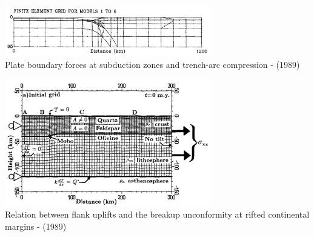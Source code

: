 \begin{center}
\begin{minipage}{0.48\textwidth}
\centering
\includegraphics[width=9cm]{images/history/boww89}\\
{\captionfont Plate boundary forces at subduction zones and trench-arc compression - 
\textcite{boww89} (1989)}
\end{minipage}\hfill
\begin{minipage}{0.45\textwidth}
\includegraphics[width=9cm]{images/history/brbe89}\\
{\captionfont Relation between flank uplifts and the breakup unconformity at rifted continental 
margins - \textcite{brbe89} (1989)}
\end{minipage}
\end{center}



